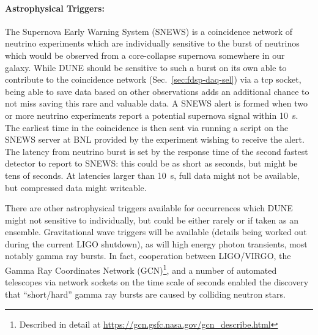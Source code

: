 \paragraph{Astrophysical Triggers:} The Supernova Early Warning System
(SNEWS) is a coincidence network of neutrino experiments which are
individually sensitive to the burst of neutrinos which would be observed
from a core-collapse supernova somewhere in our galaxy.  While DUNE
should be sensitive to such a burst on its own able to contribute to the
coincidence network (Sec.~\ref{sec:fdsp-daq-sel}) via a tcp socket,
being able to save data based on other observations adds an additional
chance to not miss saving this rare and valuable data.  A SNEWS alert is
formed when two or more neutrino experiments report a potential
supernova signal within \SI{10}{s}.  The earliest time in the
coincidence is then sent via running a script on the SNEWS server at BNL
provided by the experiment wishing to receive the alert.  The latency
from neutrino burst is set by the response time of the second fastest
detector to report to SNEWS: this could be as short as seconds, but
might be tens of seconds.  At latencies larger than \SI{10}{s}, full
data might not be available, but compressed data might writeable.

There are other astrophysical triggers available for occurrences which
DUNE might not sensitive to individually, but could be either rarely or
if taken as an ensemble.  Gravitational wave triggers will be available
(details being worked out during the current LIGO shutdown), as will
high energy photon transients, most notably gamma ray bursts.  In fact,
cooperation between LIGO/VIRGO, the Gamma Ray Coordinates Network
(GCN)\footnote{Described in detail at
  \url{https://gcn.gsfc.nasa.gov/gcn_describe.html}}, and a number of
automated telescopes via network sockets on the time scale of seconds
enabled the discovery that ``short/hard'' gamma ray bursts are caused by
colliding neutron stars\cite{kilonova}.
